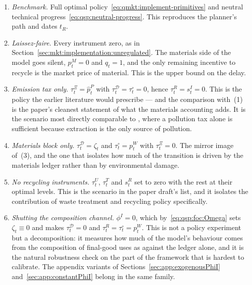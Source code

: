 \begin{enumerate}[label=\emph{(\arabic*)},leftmargin=2.4em,itemsep=0.2em]
\item \emph{Benchmark.} Full optimal policy~\eqref{eq:qmkt:implement-primitives} and neutral technical
progress~\eqref{eq:qsp:neutral-progress}. This reproduces the planner's path and dates $t_R$.

\item \emph{Laissez-faire.} Every instrument zero, as in Section~\ref{sec:mkt:implementation:unregulated}.
The materials side of the model goes silent, $p^M_t=0$ and $q_t=1$, and the only remaining incentive to
recycle is the market price of material. This is the upper bound on the delay.

\item \emph{Emission tax only.} $\tau^\Xi_t=\hat p^P_t$ with $\tau^{\mathcal D}_t=\tau^{\circ}_t=0$,
hence $\tau^R_t=s^I_t=0$. This is the policy the earlier literature would prescribe --- and the
comparison with~(1) is the paper's cleanest statement of what the materials accounting adds. It is the
scenario most directly comparable to \textcite{sorensen2018}, where a pollution tax alone is sufficient
because extraction is the only source of pollution.

\item \emph{Materials block only.} $\tau^{\mathcal D}_t=\zeta_t$ and $\tau^{\circ}_t=p^W_t$ with
$\tau^\Xi_t=0$. The mirror image of~(3), and the one that isolates how much of the transition is driven
by the materials ledger rather than by environmental damage.

\item \emph{No recycling instruments.} $\tau^U_t$, $\tau^T_t$ and $s^R_t$ set to zero with the rest at
their optimal levels. This is the scenario in the paper draft's list, and it isolates the contribution
of waste treatment and recycling policy specifically.

\item \emph{Shutting the composition channel.} $\phi^I=0$, which by~\eqref{eq:qsp:foc:Omega} sets
$\zeta_t\equiv0$ and makes $\tau^{\mathcal D}_t=0$ and $\tau^R_t=\tau^{\circ}_t=p^W_t$. This is not a
policy experiment but a decomposition: it measures how much of the model's behaviour comes from the
composition of final-good uses as against the ledger alone, and it is the natural robustness check on
the part of the framework that is hardest to calibrate. The appendix variants of
Sections~\ref{sec:app:exogenousPhiI} and~\ref{sec:app:constantPhiI} belong in the same family.


\end{enumerate}
